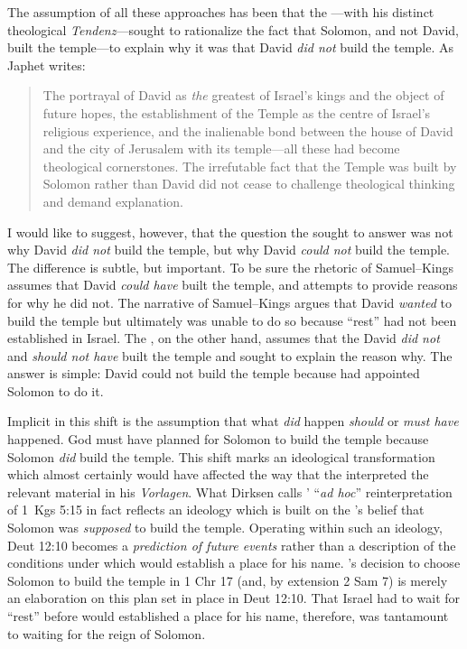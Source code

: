 The assumption of all these approaches has been that the \chronicler---with his distinct theological \emph{Tendenz}---sought to rationalize the fact that Solomon, and not David, built the temple---to explain why it was that David \emph{did not} build the temple. As Japhet writes:
\begin{quote}
    The portrayal of David as \emph{the} greatest of Israel's kings and the object of future hopes, the establishment of the Temple as the centre of Israel's religious experience, and the inalienable bond between the house of David and the city of Jerusalem with its temple---all these had become theological cornerstones. The irrefutable fact that the Temple was built by Solomon rather than David did not cease to challenge theological thinking and demand explanation.\autocite[396]{japhet1993}
\end{quote}
\noindent
I would like to suggest, however, that the question the \chronicler sought to answer was not why David \emph{did not} build the temple, but why David \emph{could not} build the temple. The difference is subtle, but important. To be sure the rhetoric of Samuel--Kings assumes that David \emph{could have} built the temple, and attempts to provide reasons for why he did not. The narrative of Samuel--Kings argues that David \emph{wanted} to build the temple but ultimately  was unable to do so because ``rest'' had not been established in Israel. The \chronicler, on the other hand, assumes that the David \emph{did not} and \emph{should not have} built the temple and sought to explain the reason why. The answer is simple: David could not build the temple because \yahweh had appointed Solomon to do it. 

Implicit in this shift is the assumption that what \emph{did} happen
\emph{should} or \emph{must have} happened. God must have planned for Solomon to build the temple because Solomon \emph{did} build the temple. This shift marks an ideological transformation which almost certainly would have affected the way that the \chronicler interpreted the relevant material in his \emph{Vorlagen}. What Dirksen calls \chronicles' ``\emph{ad hoc}'' reinterpretation of 1~Kgs 5:15 in fact reflects an ideology which is built on the \chronicler's belief that Solomon was \emph{supposed} to build the temple. Operating within such an ideology, Deut 12:10 becomes a \emph{prediction of future events} rather than a description of the conditions under which \yahweh would establish a place for his name. \yahweh's decision to choose Solomon to build the temple in 1 Chr 17 (and, by extension 2 Sam 7) is merely an elaboration on this plan set in place in Deut 12:10. That Israel had to wait for ``rest'' before \yahweh would established a place for his name, therefore, was tantamount to waiting for the reign of Solomon. 

